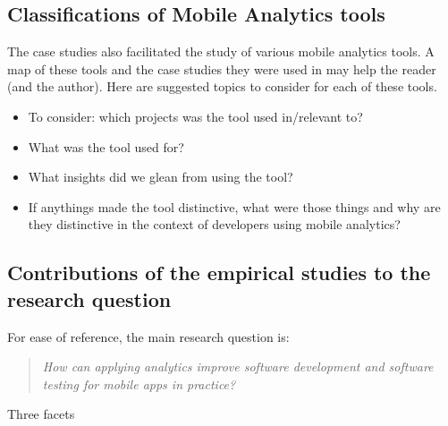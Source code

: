 \subsection{Classifications of Mobile Analytics tools}
The case studies also facilitated the study of various mobile analytics tools. A map of these tools and the case studies they were used in may help the reader (and the author). Here are suggested topics to consider for each of these tools.
\begin{itemize}
    \itemsep0em
    \item To consider: which projects was the tool used in/relevant to?
    \item What was the tool used for?
    \item What insights did we glean from using the tool?
    \item If anythings made the tool distinctive, what were those things and why are they distinctive in the context of developers using mobile analytics?
\end{itemize}

\subsection{Contributions of the empirical studies to the research question}
For ease of reference, the main research question is:
\begin{quote}
    \emph{How can applying analytics improve software development and software testing for mobile apps in practice?}    
\end{quote}
Three facets 
